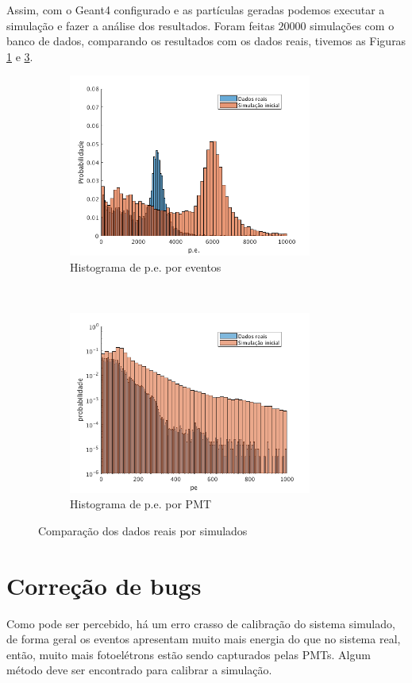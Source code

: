 Assim, com o Geant4 configurado e as partículas geradas podemos executar a simulação e fazer a análise dos resultados. Foram feitas $20000$ simulações com o banco de dados, comparando os resultados com os dados reais, tivemos as Figuras \ref{fig:a} e \ref{fig:b}.

\begin{figure}[ht]
	\centering
	\begin{subfigure}{0.5\textwidth}
		\centering
	\includegraphics[width=8cm]{textuais/simulacao/figuras/hist_evt1.png}
		\caption{Histograma de p.e. por eventos}
		\label{fig:a}
	\end{subfigure}%
	~ 
	\begin{subfigure}{0.5\textwidth}
		\centering
	\includegraphics[width=8cm]{textuais/simulacao/figuras/hist_pmt1.png}
		\caption{Histograma de p.e. por PMT}
				\label{fig:b}
	\end{subfigure}
	\caption{Comparação dos dados reais por simulados}
\end{figure}


\section{Correção de bugs}

Como pode ser percebido, há um erro crasso de calibração do sistema simulado, de forma geral os eventos apresentam muito mais energia  do que no sistema real, então, muito mais fotoelétrons estão sendo capturados pelas PMTs. Algum método deve ser encontrado para calibrar a simulação.

